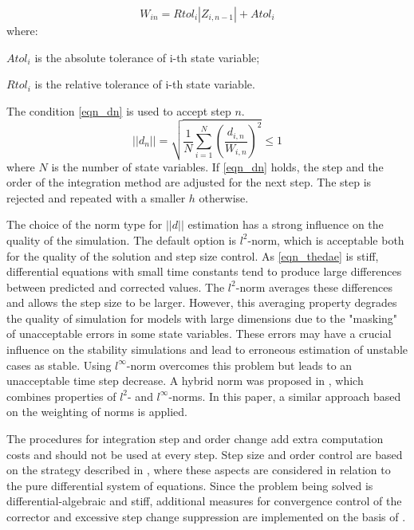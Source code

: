 \documentclass[lettersize,journal]{IEEEtran}
\begin{document}
\begin{equation}
	W_{in}=Rtol_i|Z_{i,n-1}|+Atol_i
\end{equation}
\noindent where:
\begin{description}
	\item \(Atol_i\) is the absolute tolerance of i-th state variable;
	\item \(Rtol_i\) is the relative tolerance of i-th state variable.
\end{description}

The condition \eqref{eqn_dn} is used to accept step \(n\). 
\begin{equation}
	\label{eqn_dn}
	\vert\vert d_n \vert\vert = \sqrt{\frac{1}{N} \sum_{i=1}^{N}{\left(\frac{d_{i,n}}{W_{i,n}}\right)^2}} \leq 1
\end{equation}
\noindent where \(N\) is the number of state variables.
If \eqref{eqn_dn} holds, the step and the order of the integration method are adjusted for the next step. The step is rejected and repeated with a smaller \(h\) otherwise.

The choice of the norm type for \(\vert\vert d\vert\vert \) estimation has a strong influence on the quality of the simulation. The default option is \(l^2\)-norm, which is acceptable both for the quality of the solution and step size control. As \eqref{eqn_thedae} is stiff, differential equations with small time constants tend to produce large differences between predicted and corrected values. The \(l^2\)-norm averages these differences and allows the step size to be larger.  However, this averaging property degrades the quality of simulation for models with large dimensions due to the "masking" of unacceptable errors in some state variables. These errors may have a crucial influence on the stability simulations and lead to erroneous estimation of unstable cases as stable. Using \(l^\infty\)-norm overcomes this problem but leads to an unacceptable time step decrease. A hybrid norm was proposed in \cite{pegase10}, which combines properties of \(l^2\)- and \(l^\infty\)-norms. In this paper, a similar approach based on the weighting of norms is applied.

The procedures for integration step and order change add extra computation costs and should not be used at every step. Step size and order control are based on the strategy described in \cite{Radhakrishnan1993}, where these aspects are considered in relation to the pure differential system of equations. Since the problem being solved is differential-algebraic and stiff, additional measures for convergence control of the corrector and excessive step change suppression are implemented on the basis of \cite{petzold82}.
\end{document}
